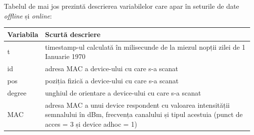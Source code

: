 \documentclass[]{article}
\begin{document}
Tabelul de mai jos prezintă descrierea variabilelor care apar în
seturile de date \emph{offline} și \emph{online}:

\begin{longtable}[]{@{}ll@{}}
\toprule
\begin{minipage}[b]{0.10\columnwidth}\raggedright\strut
Variabila\strut
\end{minipage} & \begin{minipage}[b]{0.63\columnwidth}\raggedright\strut
Scurtă descriere\strut
\end{minipage}\tabularnewline
\midrule
\endhead
\begin{minipage}[t]{0.10\columnwidth}\raggedright\strut
t\strut
\end{minipage} & \begin{minipage}[t]{0.63\columnwidth}\raggedright\strut
timestamp-ul calculată în milisecunde de la miezul nopții zilei de 1
Ianuarie 1970\strut
\end{minipage}\tabularnewline
\begin{minipage}[t]{0.10\columnwidth}\raggedright\strut
id\strut
\end{minipage} & \begin{minipage}[t]{0.63\columnwidth}\raggedright\strut
adresa MAC a device-ului cu care s-a scanat\strut
\end{minipage}\tabularnewline
\begin{minipage}[t]{0.10\columnwidth}\raggedright\strut
pos\strut
\end{minipage} & \begin{minipage}[t]{0.63\columnwidth}\raggedright\strut
poziția fizică a device-ului cu care s-a scanat\strut
\end{minipage}\tabularnewline
\begin{minipage}[t]{0.10\columnwidth}\raggedright\strut
degree\strut
\end{minipage} & \begin{minipage}[t]{0.63\columnwidth}\raggedright\strut
unghiul de orientare a device-ului cu care s-a scanat\strut
\end{minipage}\tabularnewline
\begin{minipage}[t]{0.10\columnwidth}\raggedright\strut
MAC\strut
\end{minipage} & \begin{minipage}[t]{0.63\columnwidth}\raggedright\strut
adresa MAC a unui device respondent cu valoarea intensității semnalului
în dBm, frecvența canalului și tipul acestuia (punct de acces = 3 și
device adhoc = 1)\strut
\end{minipage}\tabularnewline
\bottomrule
\end{longtable}
\end{document}
